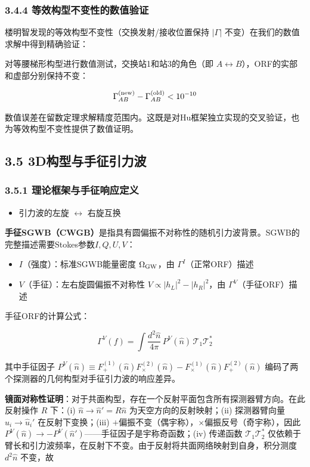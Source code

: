 \documentclass[12pt,a4paper]{article}
\begin{document}
\subsubsection{3.4.4 等效构型不变性的数值验证}


楼明智发现的等效构型不变性（交换发射/接收位置保持 $|\Gamma|$ 不变）在我们的数值求解中得到精确验证：

对等腰梯形构型进行数值测试，交换站1和站3的角色（即 $A \leftrightarrow B$），ORF的实部和虚部分别保持不变：

$$\Gamma_{AB}^{\rm (new)} - \Gamma_{AB}^{\rm (old)} < 10^{-10}$$

数值误差在留数定理求解精度范围内。这既是对Hu框架独立实现的交叉验证，也为等效构型不变性提供了数值证明。

\subsection{3.5 3D构型与手征引力波}


\subsubsection{3.5.1 理论框架与手征响应定义}

\begin{itemize}
  \item 引力波的左旋 $\leftrightarrow$ 右旋互换
\end{itemize}

\textbf{手征SGWB（CWGB）}是指具有圆偏振不对称性的随机引力波背景。SGWB的完整描述需要Stokes参数$ I,Q,U,V $：

\begin{itemize}
  \item $ I $（强度）：标准SGWB能量密度 $\Omega_{\rm GW}$，由 $\Gamma^I$（正常ORF）描述
  \item $ V $（手征）：左右旋圆偏振不对称性 $ V \propto |h_L|^2 - |h_R|^2 $，由 $\Gamma^V$（手征ORF）描述
\end{itemize}

手征ORF的计算公式：

$$\Gamma^V(f) = \int \frac{d^2\hat{n}}{4\pi} \, P^V(\hat{n}) \, \mathcal{T}_1 \mathcal{T}_2^*$$

其中手征因子 $P^V(\hat{n}) \equiv F_+^{(1)}(\hat{n}) F_\times^{(2)}(\hat{n}) - F_\times^{(1)}(\hat{n}) F_+^{(2)}(\hat{n})$ 编码了两个探测器的几何构型对手征引力波的响应差异。

\textbf{镜面对称性证明}：对于共面构型，存在一个反射平面包含所有探测器臂方向。在此反射操作 $R$ 下：(i) $\hat{n} \to \hat{n}' = R\hat{n}$ 为天空方向的反射映射；(ii) 探测器臂向量 $\hat{u}_i \to \hat{u}_i'$ 在反射下变换；(iii) $+$偏振不变（偶宇称），$\times$偏振反号（奇宇称），因此 $P^V(\hat{n}) \to -P^V(\hat{n}')$——手征因子是宇称奇函数；(iv) 传递函数 $\mathcal{T}_1\mathcal{T}_2^*$ 仅依赖于臂长和引力波频率，在反射下不变。由于反射将共面网络映射到自身，积分测度 $d^2\hat{n}$ 不变，故
\end{document}
